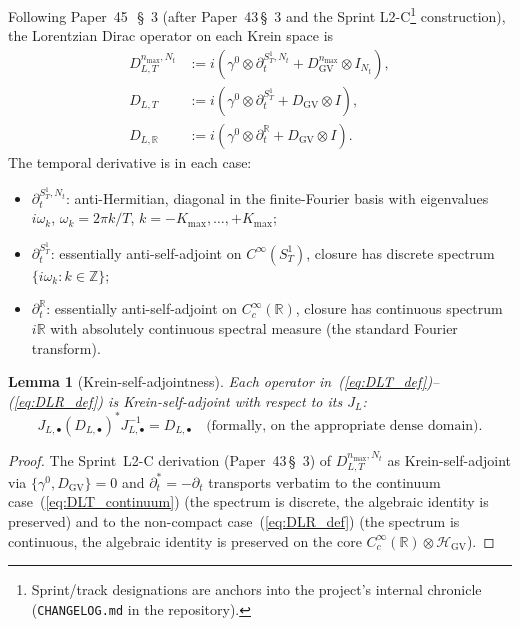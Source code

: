 \documentclass[11pt,a4paper]{article}
\theoremstyle{plain}
\newtheorem{lemma}[theorem]{Lemma}
\theoremstyle{definition}
\newcommand{\nmax}{n_{\max}}
\newcommand{\Nt}{N_{t}}
\newcommand{\Kmax}{K_{\max}}
\newcommand{\Sone}{S^{1}}
\newcommand{\SoneT}{S^{1}_{T}}
\newcommand{\R}{\mathbb{R}}
\newcommand{\Z}{\mathbb{Z}}
\newcommand{\DGV}{D_{\mathrm{GV}}}
\newcommand{\DLR}{D_{L,\R}}
\newcommand{\DLT}{D_{L,T}}
\newcommand{\JL}{J_{L}}
\newcommand{\HGV}{\mathcal{H}_{\mathrm{GV}}}
\begin{document}
Following Paper~45~\cite{paper45}\,\S~3 (after Paper~43\,\S~3 and the
Sprint L2-C\footnote{Sprint/track designations are anchors into the project's internal chronicle (\texttt{CHANGELOG.md} in the repository).} construction), the Lorentzian Dirac operator on each
Krein space is
\begin{align}
D_{L,T}^{\nmax, \Nt} &:= i(\gamma^{0}\otimes\partial_{t}^{\Sone_{T},\Nt}
+ \DGV^{\nmax}\otimes I_{\Nt}),
\label{eq:DLT_def}\\
\DLT &:= i(\gamma^{0}\otimes\partial_{t}^{\Sone_{T}} + \DGV\otimes I),
\label{eq:DLT_continuum}\\
\DLR &:= i(\gamma^{0}\otimes\partial_{t}^{\R} + \DGV\otimes I).
\label{eq:DLR_def}
\end{align}
The temporal derivative is in each case:
\begin{itemize}
\item $\partial_{t}^{\Sone_{T}, \Nt}$: anti-Hermitian, diagonal in the
finite-Fourier basis with eigenvalues $i\omega_{k}$, $\omega_{k}
= 2\pi k/T$, $k = -\Kmax, \ldots, +\Kmax$;
\item $\partial_{t}^{\Sone_{T}}$: essentially anti-self-adjoint on
$C^{\infty}(\SoneT)$, closure has discrete spectrum
$\{i\omega_{k} : k \in \Z\}$;
\item $\partial_{t}^{\R}$: essentially anti-self-adjoint on
$C_{c}^{\infty}(\R)$, closure has continuous spectrum
$i\R$ with absolutely continuous spectral measure (the standard Fourier
transform).
\end{itemize}

\begin{lemma}[Krein-self-adjointness]\label{lem:Krein_self_adjoint}
Each operator in~(\ref{eq:DLT_def})--(\ref{eq:DLR_def}) is
Krein-self-adjoint with respect to its $\JL$:
\[
J_{L,\bullet} (D_{L,\bullet})^{*} J_{L,\bullet}^{-1} = D_{L,\bullet}
\quad\text{(formally, on the appropriate dense domain)}.
\]
\end{lemma}

\begin{proof}
The Sprint~L2-C derivation (Paper~43\,\S~3) of $\DLT^{\nmax, \Nt}$ as
Krein-self-adjoint via $\{\gamma^{0}, \DGV\} = 0$ and
$\partial_{t}^{*} = -\partial_{t}$ transports verbatim to the continuum
case~(\ref{eq:DLT_continuum}) (the spectrum is discrete, the algebraic
identity is preserved) and to the non-compact case~(\ref{eq:DLR_def})
(the spectrum is continuous, the algebraic identity is preserved on the
core $C_{c}^{\infty}(\R) \otimes \HGV$).
\end{proof}
\end{document}
